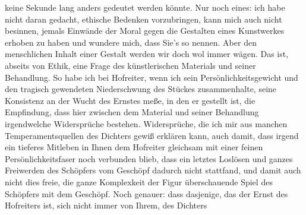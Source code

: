 \begin{ledgroupsized}[t]{13cm}
               keine Sekunde lang anders gedeutet werden könnte.\pend
           \pstart
           Nur noch eines: ich habe nicht daran gedacht, ethische Bedenken vorzubringen, kann
               mich auch nicht besinnen, jemals Einwände der Moral gegen die Gestalten eines
               Kunstwerkes erhoben zu haben und wundere mich, dass Sie’s so nennen. Aber den
               menschlichen Inhalt einer Gestalt werden wir doch wol immer wägen. Das ist, abseits
               von Ethik, eine Frage des künstlerischen Materials und seiner Behandlung. So habe ich
               bei Hofreiter, wenn ich sein
               Persönlichkeitsgewicht und den tragisch gewendeten Niederschwung des Stückes zusammenhalte, seine Konsistenz an
               der Wucht des Ernstes meße, in den er gestellt ist, die {\pb}Empfindung, dass hier zwischen
               dem Material und seiner Behandlung irgendwelche Widersprüche bestehen. Widersprüche,
               die ich mir aus manchen Temperamentsquellen des Dichters gewiß erklären kann, auch
               damit, dass irgend ein tieferes Mitleben in Ihnen dem Hofreiter gleichsam mit einer feinen Persönlichkeitsfaser
               noch verbunden blieb, dass ein letztes Loslösen und ganzes Freiwerden des Schöpfers
               vom Geschöpf dadurch nicht stattfand, und damit auch nicht dies freie, die ganze
               Komplexkeit der Figur überschauende Spiel des Schöpfers mit dem Geschöpf. Noch
               genauer: dass dasjenige, das der Ernst des Hofreiters ist, sich nicht immer von Ihrem, des Dichters

\end{ledgroupsized}
